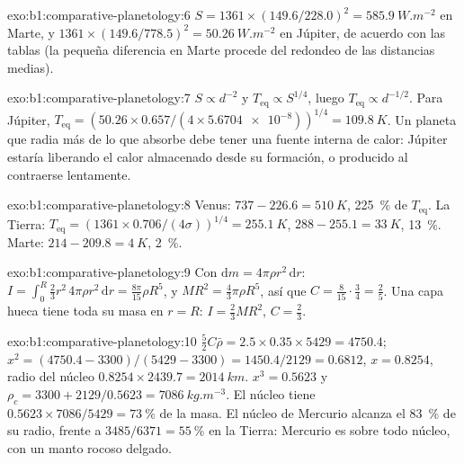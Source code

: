 \begin{solution}{exo:b1:comparative-planetology:6}
$S = 1361\times(149.6/228.0)^2 = \qty{585.9}{W.m^{-2}}$ en Marte, y
$1361\times(149.6/778.5)^2 = \qty{50.26}{W.m^{-2}}$ en Júpiter, de acuerdo con las tablas (la
pequeña diferencia en Marte procede del redondeo de las distancias medias).
\end{solution}

\begin{solution}{exo:b1:comparative-planetology:7}
$S \propto d^{-2}$ y $T_\mathrm{eq} \propto S^{1/4}$, luego $T_\mathrm{eq}
\propto d^{-1/2}$. Para Júpiter, $T_\mathrm{eq} = (50.26\times0.657/(4\times
\num{5.6704e-8}))^{1/4} = \qty{109.8}{K}$. Un planeta que radia más de lo que absorbe debe tener
una fuente interna de calor: Júpiter estaría liberando el calor almacenado desde su formación,
o producido al contraerse lentamente.
\end{solution}

\begin{solution}{exo:b1:comparative-planetology:8}
Venus: $737 - 226.6 = \qty{510}{K}$, \qty{225}{\percent} de $T_\mathrm{eq}$.
La Tierra: $T_\mathrm{eq} = (1361\times0.706/(4\sigma))^{1/4} = \qty{255.1}{K}$,
$288 - 255.1 = \qty{33}{K}$, \qty{13}{\percent}. Marte: $214 - 209.8 =
\qty{4}{K}$, \qty{2}{\percent}.
\end{solution}

\begin{solution}{exo:b1:comparative-planetology:9}
Con $\mathrm dm = 4\pi\rho r^2\,\mathrm dr$: $I = \int_0^R\tfrac23r^2\,4\pi
\rho r^2\,\mathrm dr = \tfrac{8\pi}{15}\rho R^5$, y $MR^2 = \tfrac43\pi\rho
R^5$, así que $C = \tfrac{8}{15}\cdot\tfrac34 = \tfrac25$. Una capa hueca tiene toda su masa en
$r = R$: $I = \tfrac23MR^2$, $C = \tfrac23$.
\end{solution}

\begin{solution}{exo:b1:comparative-planetology:10}
$\tfrac52C\bar\rho = 2.5\times0.35\times5429 = 4750.4$;
$x^2 = (4750.4 - 3300)/(5429 - 3300) = 1450.4/2129 = 0.6812$, $x = 0.8254$,
radio del núcleo $0.8254\times2439.7 = \qty{2014}{km}$. $x^3 = 0.5623$ y
$\rho_c = 3300 + 2129/0.5623 = \qty{7086}{kg.m^{-3}}$. El núcleo tiene
$0.5623\times7086/5429 = \qty{73}{\percent}$ de la masa. El núcleo de Mercurio
alcanza el \qty{83}{\percent} de su radio, frente a $3485/6371 =
\qty{55}{\percent}$ en la Tierra: Mercurio es sobre todo núcleo, con un manto rocoso delgado.
\end{solution}

